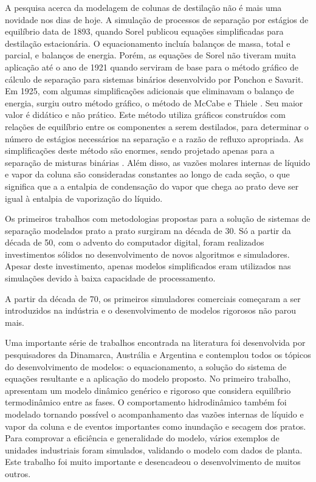 A pesquisa acerca da modelagem de colunas de destilação não é mais uma novidade nos dias de hoje. A simulação de
processos de separação por estágios de equilíbrio data de 1893, quando Sorel publicou equações simplificadas para
destilação estacionária. O equacionamento incluía balanços de massa, total e parcial, e balanços de energia. Porém,
as equações de Sorel não tiveram muita aplicação até o ano de 1921 quando serviram de base para o método gráfico
de cálculo de separação para sistemas binários desenvolvido por Ponchon e Savarit. Em 1925, com algumas
simplificações adicionais que eliminavam o balanço de energia, surgiu outro método gráfico, o método de
McCabe e Thiele \cite{Kooijman:1995a}. Seu maior valor é didático e não prático.
Este método utiliza gráficos construídos com relações de equilíbrio
entre os componentes a serem destilados, para determinar o número de estágios necessários na separação e a
razão de refluxo apropriada. As simplificações deste método são enormes, sendo projetado apenas para a separação
de misturas binárias \cite{Brooks:1993}.
Além disso, as vazões molares internas de líquido e vapor da coluna são consideradas constantes ao longo de cada seção, o
que significa que a a entalpia de condensação do vapor que chega ao prato deve
ser igual à entalpia de vaporização do líquido.

Os primeiros trabalhos com metodologias propostas para a solução de sistemas de separação modelados prato a prato
surgiram na década de 30. Só a partir da década de 50, com o advento do computador digital, foram realizados
investimentos sólidos no desenvolvimento de novos algoritmos e simuladores. Apesar deste investimento, apenas
modelos simplificados eram utilizados nas simulações devido à baixa capacidade
de processamento.

A partir da década de 70, os primeiros simuladores comerciais começaram a ser introduzidos na indústria e
o desenvolvimento de modelos rigorosos não parou mais.

Uma importante série de trabalhos encontrada na literatura foi desenvolvida por pesquisadores da Dinamarca,
Austrália e Argentina e contemplou todos os tópicos do desenvolvimento de modelos: o equacionamento, a solução
do sistema de equações resultante e a aplicação do modelo proposto.
No primeiro trabalho,  apresentam um modelo dinâmico genérico e rigoroso que considera
equilíbrio termodinâmico entre as fases.
O comportamento hidrodinâmico também foi modelado tornando possível o acompanhamento das vazões internas de
líquido e vapor da coluna e de eventos importantes como inundação e secagem dos pratos.
Para comprovar a eficiência e generalidade do modelo, vários exemplos de unidades industriais foram simulados,
validando o modelo com dados de planta.
Este trabalho foi muito importante e desencadeou o desenvolvimento de muitos outros.

